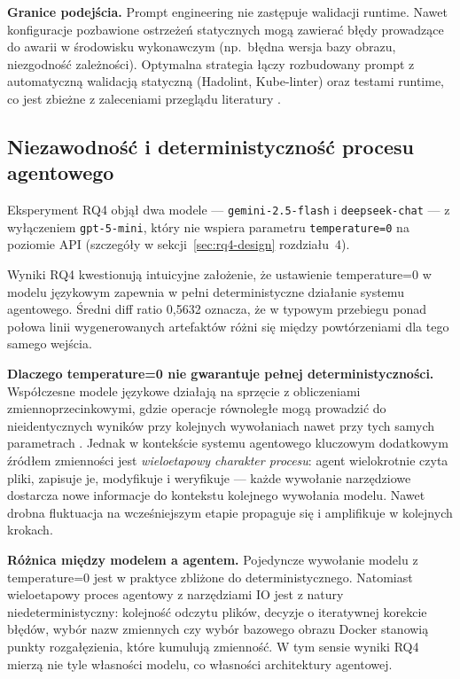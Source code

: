 \textbf{Granice podejścia.} Prompt engineering nie zastępuje walidacji runtime. Nawet konfiguracje pozbawione ostrzeżeń statycznych mogą zawierać błędy prowadzące do awarii w środowisku wykonawczym (np.\ błędna wersja bazy obrazu, niezgodność zależności). Optymalna strategia łączy rozbudowany prompt z automatyczną walidacją statyczną (Hadolint, Kube-linter) oraz testami runtime, co jest zbieżne z zaleceniami przeglądu literatury \cite{srivatsa_survey_2024}.

\subsection{Niezawodność i deterministyczność procesu agentowego}

Eksperyment RQ4 objął dwa modele — \texttt{gemini-2.5-flash} i \texttt{deepseek-chat} — z wyłączeniem \texttt{gpt-5-mini}, który nie wspiera parametru \texttt{temperature=0} na poziomie API (szczegóły w sekcji~\ref{sec:rq4-design} rozdziału~4).

Wyniki RQ4 kwestionują intuicyjne założenie, że ustawienie temperature=0 w modelu językowym zapewnia w pełni deterministyczne działanie systemu agentowego. Średni diff ratio 0{,}5632 oznacza, że w typowym przebiegu ponad połowa linii wygenerowanych artefaktów różni się między powtórzeniami dla tego samego wejścia.

\textbf{Dlaczego temperature=0 nie gwarantuje pełnej deterministyczności.} Współczesne modele językowe działają na sprzęcie z obliczeniami zmiennoprzecinkowymi, gdzie operacje równoległe mogą prowadzić do nieidentycznych wyników przy kolejnych wywołaniach nawet przy tych samych parametrach \cite{zhao_survey_2025}. Jednak w kontekście systemu agentowego kluczowym dodatkowym źródłem zmienności jest \textit{wieloetapowy charakter procesu}: agent wielokrotnie czyta pliki, zapisuje je, modyfikuje i weryfikuje — każde wywołanie narzędziowe dostarcza nowe informacje do kontekstu kolejnego wywołania modelu. Nawet drobna fluktuacja na wcześniejszym etapie propaguje się i amplifikuje w kolejnych krokach.

\textbf{Różnica między modelem a agentem.} Pojedyncze wywołanie modelu z temperature=0 jest w praktyce zbliżone do deterministycznego. Natomiast wieloetapowy proces agentowy z narzędziami IO jest z natury niedeterministyczny: kolejność odczytu plików, decyzje o iteratywnej korekcie błędów, wybór nazw zmiennych czy wybór bazowego obrazu Docker stanowią punkty rozgałęzienia, które kumulują zmienność. W tym sensie wyniki RQ4 mierzą nie tyle własności modelu, co własności architektury agentowej.

